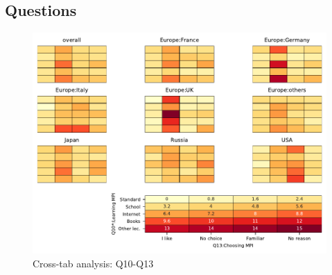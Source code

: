 
\subsection{Questions}


\begin{figure}
\begin{center}
\includegraphics[width=12cm]{../pdfs/Q10-Q13.pdf}
\caption{Cross-tab analysis: Q10-Q13}
\label{fig:Q10-Q13}
\end{center}
\end{figure}
